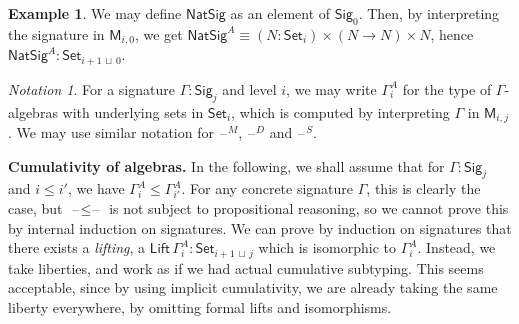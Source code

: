 \documentclass[12pt,a4paper,twoside,openany]{book}
\theoremstyle{remark}
\newtheorem{notation}{Notation}
\theoremstyle{definition}
\newtheorem{myexample}{Example}
\theoremstyle{theorem}
\newcommand{\ms}[1]{\mathsf{#1}}
\newcommand{\bs}[1]{\boldsymbol{#1}}
\newcommand{\blank}{\mathord{\hspace{1pt}\text{--}\hspace{1pt}}}
\newcommand{\Set}{\mathsf{Set}}
\newcommand{\Sig}{\mathsf{Sig}}
\newcommand{\bM}{\bs{\mathsf{M}}}
\newcommand{\lub}{\,\sqcup\,}
\begin{document}
\begin{myexample}
We may define $\ms{NatSig}$ as an element of $\Sig_0$. Then, by interpreting the
signature in $\bM_{i,0}$, we get $\ms{NatSig}^A \equiv (N : \Set_i) \times (N
\to N) \times N$, hence $\ms{NatSig}^A : \Set_{i + 1 \lub 0}$.
\end{myexample}

\begin{notation}
For a signature $\Gamma : \Sig_j$ and level $i$, we may write $\Gamma^A_i$ for
the type of $\Gamma$-algebras with underlying sets in $\Set_i$, which is
computed by interpreting $\Gamma$ in $\bM_{i,j}$. We may use similar notation
for $\blank^M$, $\blank^D$ and $\blank^S$.
\end{notation}

\noindent\textbf{Cumulativity of algebras.} In the following, we shall assume
that for $\Gamma : \Sig_j$ and $i \leq i'$, we have $\Gamma^A_i \leq
\Gamma^A_{i'}$. For any concrete signature $\Gamma$, this is clearly the case,
but $\blank\!\leq\!\blank$ is not subject to propositional reasoning, so we
cannot prove this by internal induction on signatures. We can prove by induction
on signatures that there exists a \emph{lifting}, a $\ms{Lift}\,\Gamma^A_i :
\Set_{i+1 \lub j}$ which is isomorphic to $\Gamma^A_{i}$. Instead, we take
liberties, and work as if we had actual cumulative subtyping. This seems
acceptable, since by using implicit cumulativity, we are already taking the same
liberty everywhere, by omitting formal lifts and isomorphisms.
\end{document}
